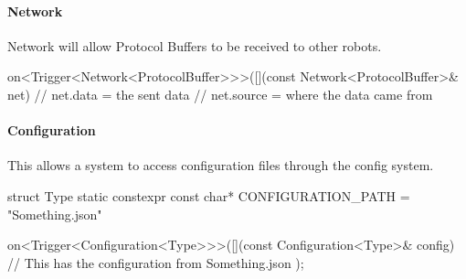 \documentclass[a4paper]{article}
\begin{document}
	\paragraph{Network} Network will allow Protocol Buffers to be received to other robots.\\
	\begin{cppcode}
		on<Trigger<Network<ProtocolBuffer>>>([](const Network<ProtocolBuffer>& net) {
			// net.data = the sent data
			// net.source = where the data came from
		}
	\end{cppcode}
	
	\paragraph{Configuration} This allows a system to access configuration files through the config system.\\
	\begin{cppcode}
		struct Type {
			static constexpr const char* CONFIGURATION_PATH = "Something.json"
		}
		
		on<Trigger<Configuration<Type>>>([](const Configuration<Type>& config) {
			// This has the configuration from Something.json
		});
	\end{cppcode}
\end{document}
